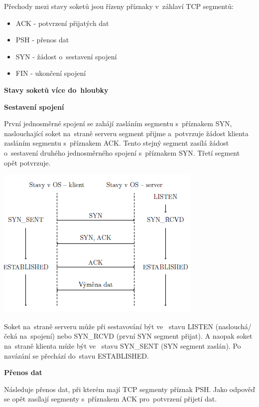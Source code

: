 Přechody mezi stavy soketů jsou řízeny příznaky v~záhlaví TCP segmentů:
\begin{itemize}
    \item ACK - potvrzení přijatých dat
    \item PSH - přenos dat
    \item SYN - žádost o~sestavení spojení
    \item FIN - ukončení spojení
\end{itemize}

\begin{Large}
    \vspace{0,5cm}
    \textbf{Stavy soketů více do~hloubky}
\end{Large}

\vspace{0,5cm}
\textbf{Sestavení spojení}

První jednosměrné spojení se zahájí zasláním segmentu s~příznakem SYN, naslouchající soket na~straně serveru segment přijme a~potvrzuje žádost klienta zasláním segmentu s~příznakem ACK. Tento stejný segment zasílá žádost o~sestavení druhého jednosměrného spojení s~příznakem SYN. Třetí segment opět potvrzuje. 

\begin{center}
    \includegraphics[scale=1]{images/network_three_handshake.png}
\end{center}

Soket na~straně serveru může při sestavování být ve~ stavu LISTEN (naslouchá/čeká na~spojení) nebo SYN\_RCVD (první SYN segment přijat). A naopak soket na~straně klienta může být ve~ stavu SYN\_SENT (SYN segment zaslán). Po navázání se přechází do~stavu ESTABLISHED.

\vspace{0,5cm}
\textbf{Přenos dat}

Následuje přenos dat, při kterém mají TCP segmenty příznak PSH. Jako odpověď se opět zasílají segmenty s~příznakem ACK pro~potvrzení přijetí dat. 

